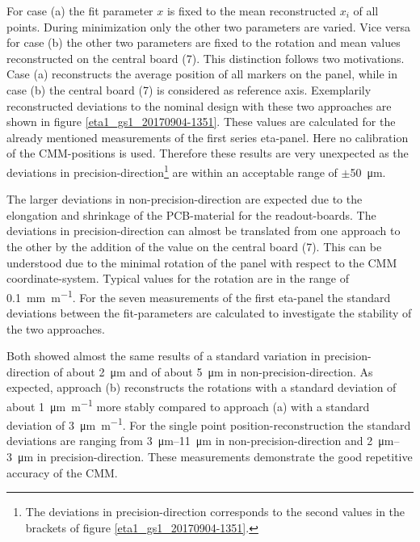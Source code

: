 \documentclass[
twoside,            %
BCOR1.4cm,          %
10pt,               %
headings=normal,    %
headsepline,        %
clearplainpage,		%
final,              %
div=14,
open=right,
bibliography=toc
]{scrreprt}
\begin{document}
For case (a) the fit parameter $x$ is fixed to the mean reconstructed $x_i$ of all points.
During minimization only the other two parameters are varied.
Vice versa for case (b) the other two parameters are fixed to the rotation and mean values reconstructed on the central board (7).
This distinction follows two motivations.
Case (a) reconstructs the average position of all markers on the panel, while in case (b) the central board (7) is considered as reference axis.
Exemplarily reconstructed deviations to the nominal design with these two approaches are shown in figure \ref{eta1_gs1_20170904-1351}.
These values are calculated for the already mentioned measurements of the first series eta-panel.
Here no calibration of the CMM-positions is used.
Therefore these results are very unexpected as the deviations in precision-direction\footnote{
	The deviations in precision-direction corresponds to the second values in the brackets of figure \ref{eta1_gs1_20170904-1351}.
} are within an acceptable range of $\pm$\SI{50}{\micro\m}.

The larger deviations in non-precision-direction are expected due to the elongation and shrinkage of the PCB-material for the readout-boards.
The deviations in precision-direction can almost be translated from one approach to the other by the addition of the value on the central board (7).
This can be understood due to the minimal rotation of the panel with respect to the CMM coordinate-system.
Typical values for the rotation are in the range of \SI{0.1}{\mm\per\m}.
For the seven measurements of the first eta-panel the standard deviations between the fit-parameters are calculated to investigate the stability of the two approaches.

Both showed almost the same results of a standard variation in precision-direction of about \SI{2}{\micro\m} and of about \SI{5}{\micro\m} in non-precision-direction.
As expected, approach (b) reconstructs the rotations with a standard deviation of about \SI{1}{\micro\m\per\m} more stably compared to approach (a) with a standard deviation of \SI{3}{\micro\m\per\m}.
For the single point position-reconstruction the standard deviations are ranging from \SIrange{3}{11}{\micro\m} in non-precision-direction and \SIrange{2}{3}{\micro\m} in precision-direction.
These measurements demonstrate the good repetitive accuracy of the CMM.
\end{document}
